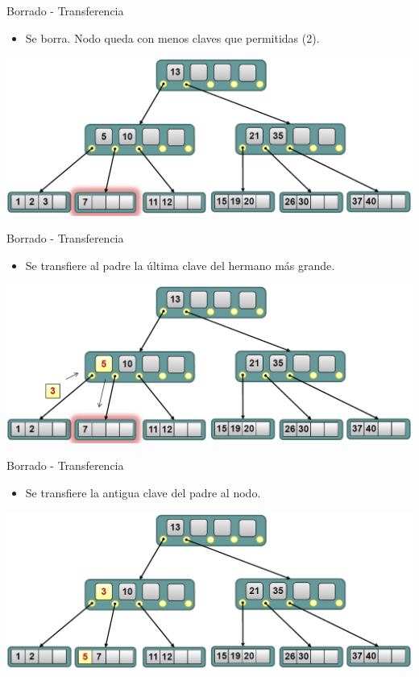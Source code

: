 \documentclass[handout]{beamer} %
\newcommand{\redb}[1]{{\color{red!70!black}{#1}}}
\begin{document}
\begin{frame}{Borrado - Transferencia}
    \begin{itemize}
        \item Se borra. Nodo queda con menos claves que permitidas (2).
    \end{itemize}
    \begin{center}
        \includegraphics[width=\textwidth]{./image/cap3/b-tree-delete5}
    \end{center}
\end{frame}

\begin{frame}{Borrado - Transferencia}
    \begin{itemize}
        \item Se transfiere al padre la última clave del hermano más grande.
    \end{itemize}
    \begin{center}
        \includegraphics[width=\textwidth]{./image/cap3/b-tree-delete6}
    \end{center}
\end{frame}

\begin{frame}{Borrado - Transferencia}
    \begin{itemize}
        \item Se transfiere la antigua clave del padre al nodo. \redb{Fin}
    \end{itemize}
    \begin{center}
        \includegraphics[width=\textwidth]{./image/cap3/b-tree-delete7}
    \end{center}
\end{frame}
\end{document}
